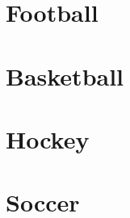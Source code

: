 \documentclass[
  11pt,
]{book}
\theoremstyle{definition}
\theoremstyle{definition}
\theoremstyle{definition}
\theoremstyle{definition}
\theoremstyle{remark}
\begin{document}
\hypertarget{football-1}{%
\chapter{Football}\label{football-1}}

\hypertarget{basketball-1}{%
\chapter{Basketball}\label{basketball-1}}

\hypertarget{hockey-1}{%
\chapter{Hockey}\label{hockey-1}}

\hypertarget{soccer-1}{%
\chapter{Soccer}\label{soccer-1}}

  
\end{document}
